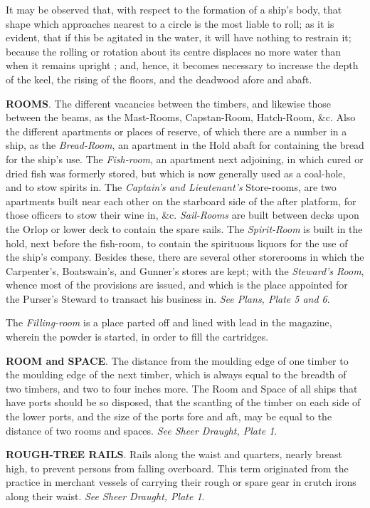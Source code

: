 It may be observed that, with respect to the formation of a ship's body, that shape which approaches nearest to a circle is the most liable to roll; as it is evident, that if this be agitated in the water, it will have nothing to restrain it; because the rolling or rotation about its centre displaces no more water than when it remains upright ; and, hence, it becomes necessary to increase the depth of the keel, the rising of the floors, and the deadwood afore and abaft. 

\textbf{ROOMS}. The different vacancies between the timbers, and likewise those between the beams, as the Mast-Rooms, Capstan-Room, Hatch-Room, \&c. Also the different apartments or places of reserve, of which there are a number in a ship, as the \textit{Bread-Room}, an apartment in the Hold abaft for containing the bread for the ship's use. The \textit{Fish-room}, an apartment next adjoining, in which cured or dried fish was formerly stored, but which is now generally used as a coal-hole, and to stow spirits in. The \textit{Captain's and Lieutenant's} Store-rooms, are two apartments built near each other on the starboard side of the after platform, for those officers to stow their wine in, \&c. \textit{Sail-Rooms} are built between decks upon the Orlop or lower deck to contain the spare sails. The \textit{Spirit-Room} is built in the hold, next before the fish-room, to contain the spirituous liquors for the use of the ship's company. Besides these, there are several other storerooms in which the Carpenter's, Boatswain's, and Gunner's stores are kept; with the \textit{Steward's Room}, whence most of the provisions are issued, and which is the place appointed for the Purser's Steward to transact his business in. \textit{See Plans, Plate 5 and 6}. 

The \textit{Filling-room} is a place parted off and lined with lead in the magazine, wherein the powder is started, in order to fill the cartridges. 

\textbf{ROOM and SPACE}. The distance from the moulding edge of one timber to the moulding edge of the next timber, which is always equal to the breadth of two timbers, and two to four inches more. The Room and Space of all ships that have ports should be so disposed, that the scantling of the timber on each side of the lower ports, and the size of the ports fore and aft, may be equal to the distance of two rooms and spaces. \textit{See Sheer Draught, Plate 1}. 

\textbf{ROUGH-TREE RAILS}. Rails along the waist and quarters, nearly breast high, to prevent persons from falling overboard. This term originated from the practice in merchant vessels of carrying their rough or spare gear in crutch irons along their waist. \textit{See Sheer Draught, Plate 1}. 

